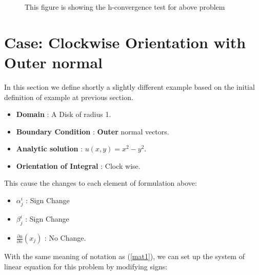 \begin{figure}[h]
    \begin{center}
    \caption{This figure is showing the h-convergence test for above problem}
    \end{center}
\end{figure}


\section{Case: Clockwise Orientation with Outer normal}
In this section we define shortly a slightly different example
based on the initial definition of example at previous section.

\begin{itemize}
\item {\bf Domain} : A Disk of radius 1.
\item {\bf Boundary Condition} : {\bf Outer} normal vectors.
\item {\bf Analytic solution} : $u(x,y) = x^2 - y^2$.
\item {\bf Orientation of Integral} : Clock wise.
\end{itemize}

This cause the changes to each element of formulation above:
\begin{itemize}
\item {\bf $\alpha^i_j$} : Sign Change
\item {\bf $\beta^i_j$} : Sign Change
\item {\bf $\frac{\partial u}{\partial n}(x_j)$} : No Change.
\end{itemize}

With the same meaning of notation as (\ref{mat1}), we can set up
the system of linear equation for this problem by modifying signs:


